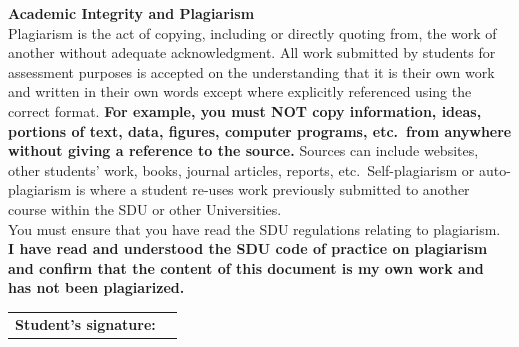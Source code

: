 \begin{titlepage}
    \begin{flushleft}
    \footnotesize
    \textbf{Academic Integrity and Plagiarism} \\[0.3cm]
    Plagiarism is the act of copying, including or directly quoting from, the work of another
    without adequate acknowledgment. All work submitted by students for assessment purposes is
    accepted on the understanding that it is their own work and written in their own words except
    where explicitly referenced using the correct format. \textbf{For example, you must NOT copy
    information, ideas, portions of text, data, figures, computer programs, etc.\ from anywhere
    without giving a reference to the source.} Sources can include websites, other students'
    work, books, journal articles, reports, etc.\ Self-plagiarism or auto-plagiarism is where a
    student re-uses work previously submitted to another course within the SDU or other
    Universities. \\[0.4cm]
    You must ensure that you have read the SDU regulations relating to plagiarism. \\[0.3cm]
    \normalsize
    \textbf{I have read and understood the SDU code of practice on plagiarism and confirm that
    the content of this document is my own work and has not been plagiarized.}
    \end{flushleft}

    \vspace{0.5cm}
    \begin{tabular}{@{}p{5cm} p{8cm}@{}}
    \textbf{Student's signature:} &
    \underline{\hspace{8cm}} \\[0.5em]
    \end{tabular}

\end{titlepage}
